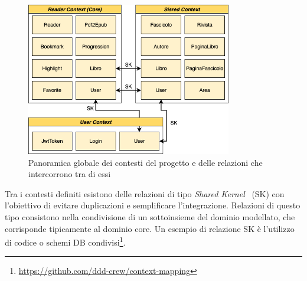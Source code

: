 \begin{figure}[H]
    \centering
    \includegraphics[width=0.8\textwidth]{img/ddd-context-map.png}
    \caption{Panoramica globale dei contesti del progetto e delle relazioni che intercorrono tra di essi}
    \label{context-map-png}
\end{figure}

Tra i contesti definiti esistono delle relazioni di tipo \textit{Shared Kernel}~\cite{evans_domain-driven_2004} (SK) con l'obiettivo di evitare duplicazioni e semplificare l'integrazione. Relazioni di questo tipo consistono nella condivisione di un sottoinsieme del dominio modellato, che corrisponde tipicamente al dominio core. Un esempio di relazione SK è l'utilizzo di codice o schemi DB condivisi\footnote{\href{https://github.com/ddd-crew/context-mapping}{https://github.com/ddd-crew/context-mapping}}.


